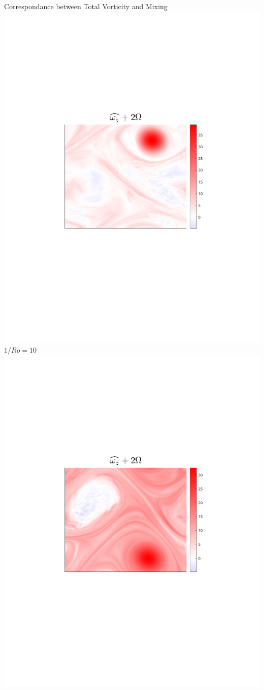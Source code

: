 \documentclass[aspecttatio=169]{beamer}
\begin{document}
\begin{frame}{Correspondance between Total Vorticity and Mixing}
        \includegraphics[width=1\textwidth]{images/Om3B30_vortz_bar.pdf}
    \emp
        \centering
        $1/Ro = 10$
        \includegraphics[width=1\textwidth]{images/Om10B30_vortz_bar.pdf}

\end{frame}
\end{document}
